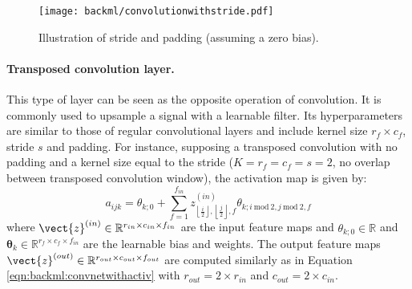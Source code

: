 \begin{figure}
  \centering
  \texttt{[image: backml/convolutionwithstride.pdf]}
  \caption{Illustration of stride and padding (assuming a zero bias).}
  \label{fig:backml:paddingstride}
\end{figure}

\paragraph{Transposed convolution layer.} This type of layer can be seen as the opposite 
operation of convolution. It is commonly used to upsample a signal with a learnable filter. 
Its hyperparameters are similar to those of regular convolutional layers and include kernel size 
$r_f \times c_f$, stride $s$ and padding. For instance, supposing a transposed 
convolution with no padding and a kernel size equal to the stride ($K = r_f = c_f = s = 2$, 
\ie no overlap between transposed convolution window), the activation map 
is given by:
\begin{equation}
  \label{eqn:backml:transposed_convolution}
  a_{ijk} = \theta_{k;0} + \sum_{f=1}^{f_{in}} z^{(in)}_{\left\lfloor\frac{i}{2}\right\rfloor, \left\lfloor\frac{j}{2}\right\rfloor, f} \theta_{k; i~\text{mod}~2,j~\text{mod}~2,f}
\end{equation}
where $\vect{z}^{(in)} \in \mathbb{R}^{r_{in} \times c_{in} \times f_{in}}$ are the input feature maps and $\theta_{k;0} \in \mathbb{R}$ and $\pmb{\theta}_k \in \mathbb{R}^{r_f \times c_f \times f_{in}}$ are the learnable bias and weights. The output feature maps $\vect{z}^{(out)} \in \mathbb{R}^{r_{out} \times c_{out} \times f_{out}}$ are computed similarly as in Equation \ref{eqn:backml:convnetwithactiv} with $r_{out} = 2 \times r_{in}$ and $c_{out} = 2 \times c_{in}$. 

